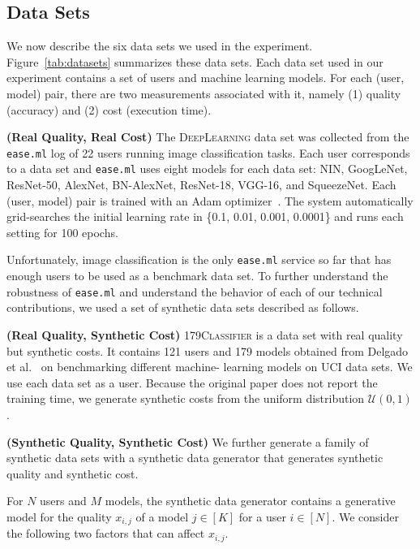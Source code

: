 \documentclass[letterpaper]{vldb}
\newcommand{\eml}{\texttt{ease.ml}\xspace}
\begin{document}
\subsection{Data Sets}

We now describe the six data sets we used
in the experiment. Figure~\ref{tab:datasets} summarizes these data sets.
Each data set used in our experiment 
contains a set of users and machine learning models. For each (user, model)
pair, there are two measurements
associated with it, namely (1) quality
(accuracy) and (2) cost
(execution time).

\vspace{0.5em}
\noindent
{\bf (Real Quality, Real Cost)} The 
\textsc{DeepLearning} data set was collected
from the \eml log of 22 users running image classification tasks. Each
user corresponds to a data set and
\eml uses eight models for
each data set:
NIN, GoogLeNet, ResNet-50, AlexNet, BN-AlexNet, ResNet-18, VGG-16, and SqueezeNet.
Each (user, model) pair is trained with
an Adam optimizer~\cite{Kingma2014}. The
system automatically grid-searches 
the initial learning rate in
\{0.1, 0.01, 0.001, 0.0001\} and
runs each setting for 100 epochs.

\vspace{0.5em}
Unfortunately, image classification 
is the only \eml service so far that
has enough users
to be used as a benchmark data set.
To further understand the robustness
of \eml and understand the
behavior of each of our technical
contributions, we used a set
of synthetic data sets described
as follows.

\vspace{0.5em}
\noindent
{\bf (Real Quality, Synthetic Cost)} 
\textsc{179Classifier}
is a data set with real quality 
but synthetic costs. It contains
121 users and 179 models obtained from
Delgado et al.~\cite{DelgadoCBA14}
on benchmarking different machine-
learning models on UCI data sets.
We use each data set as a user.
Because the original paper does not
report the training time, we 
generate synthetic costs from the uniform distribution $\mathcal{U}(0, 1)$.

\vspace{0.5em}
\noindent
{\bf (Synthetic Quality, Synthetic Cost)}
We further generate a family of 
synthetic data sets with a 
synthetic data generator that generates
synthetic quality and synthetic cost.

For $N$ users and $M$ models, the synthetic
data generator contains a generative model 
for the quality $x_{i,j}$ of a 
model $j\in[K]$ for a user $i\in[N]$.
We consider the following two factors that can affect $x_{i,j}$.
\end{document}
